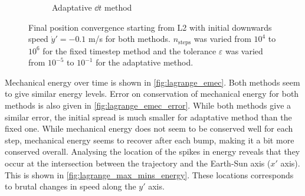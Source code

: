 \begin{figure}[h]
\begin{subfigure}{0.49\linewidth}
        \caption{Adaptative \(\dd t\) method}
        \label{fig:lagrange_conv_adapt}
    \end{subfigure}
    \caption{Final position convergence starting from L2 with initial downwards speed \(\dot y' = -0.1\) m/s for both methods. \(n_\textrm{steps}\) was varied from \(10^4\) to \(10^6\) for the fixed timestep method and the tolerance \(\varepsilon\) was varied from \(10^{-5}\) to \(10^{-1}\) for the adaptative method.}
    \label{fig:lagrange_conv}
\end{figure}

Mechanical energy over time is shown in \autoref{fig:lagrange_emec}. Both methods seem to give similar energy levels. Error on conservation of mechanical energy for both methods is also given in \autoref{fig:lagrange_emec_error}. While both methods give a similar error, the initial spread is much smaller for adaptative method than the fixed one. While mechanical energy does not seem to be conserved well for each step, mechanical energy seems to recover after each bump, making it a bit more conserved overall. Analysing the location of the spikes in energy reveals that they occur at the intersection between the trajectory and the Earth-Sun axis (\(x'\) axis). This is shown in \autoref{fig:lagrange_max_mins_energy}. These locations corresponds to brutal changes in speed along the \(y'\) axis.

